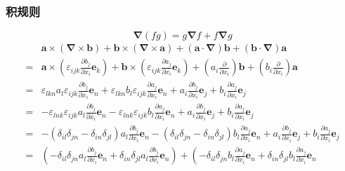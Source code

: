 \subsubsection{积规则}
\begin{equation}
    \boldsymbol{\nabla}(fg)=g\boldsymbol{\nabla}f+f\boldsymbol{\nabla}g
\end{equation}
    \begin{align}
    &\boldsymbol{a}\times(\boldsymbol{\nabla}\times\boldsymbol{b})+
    \boldsymbol{b}\times(\boldsymbol{\nabla}\times\boldsymbol{a})+
    (\boldsymbol{a}\cdot\boldsymbol{\nabla})\boldsymbol{b}+
    (\boldsymbol{b}\cdot\boldsymbol{\nabla})\boldsymbol{a}\nonumber\\
    =& 
    \boldsymbol{a}\times\left(\varepsilon_{ijk}\frac{\partial b_j}{\partial x_i}\boldsymbol{e}_k\right)+
    \boldsymbol{b}\times\left(\varepsilon_{ijk}\frac{\partial a_j}{\partial x_i}\boldsymbol{e}_k\right)+
    \left(a_i\frac{\partial}{\partial x_i}\right)\boldsymbol{b}+
    \left(b_i\frac{\partial}{\partial x_i}\right)\boldsymbol{a}\nonumber\\
    =&
    \varepsilon_{lkn}a_l\varepsilon_{ijk}\frac{\partial b_j}{\partial x_i}\boldsymbol{e}_n+
    \varepsilon_{lkn}b_l\varepsilon_{ijk}\frac{\partial a_j}{\partial x_i}\boldsymbol{e}_n+
    a_i\frac{\partial b_j}{\partial x_i}\boldsymbol{e}_j+
    b_i\frac{\partial a_j}{\partial x_i}\boldsymbol{e}_j\nonumber\\
    =&
    -\varepsilon_{lnk}\varepsilon_{ijk}a_l\frac{\partial b_j}{\partial x_i}\boldsymbol{e}_n-
    \varepsilon_{lnk}\varepsilon_{ijk}b_l\frac{\partial a_j}{\partial x_i}\boldsymbol{e}_n+
    a_i\frac{\partial b_j}{\partial x_i}\boldsymbol{e}_j+
    b_i\frac{\partial a_j}{\partial x_i}\boldsymbol{e}_j\nonumber\\
    =&
    -(\delta_{il}\delta_{jn}-\delta_{in}\delta_{jl})a_l\frac{\partial b_j}{\partial x_i}\boldsymbol{e}_n-
    (\delta_{il}\delta_{jn}-\delta_{in}\delta_{jl})b_l\frac{\partial a_j}{\partial x_i}\boldsymbol{e}_n+
    a_i\frac{\partial b_j}{\partial x_i}\boldsymbol{e}_j+
    b_i\frac{\partial a_j}{\partial x_i}\boldsymbol{e}_j\nonumber\\
    =&
    \left(
        -\delta_{il}\delta_{jn}a_l\frac{\partial b_j}{\partial x_i}\boldsymbol{e}_n
        +\delta_{in}\delta_{jl}a_l\frac{\partial b_j}{\partial x_i}\boldsymbol{e}_n
    \right)
    +
    \left(
        -\delta_{il}\delta_{jn}b_l\frac{\partial a_j}{\partial x_i}\boldsymbol{e}_n
        +\delta_{in}\delta_{jl}b_l\frac{\partial a_j}{\partial x_i}\boldsymbol{e}_n

\end{align}
